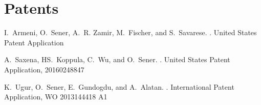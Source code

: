     \section{\mysidestyle \textcolor{olgray}{Patents}}
    	I.~Armeni, O.~Sener, A.~R. Zamir, M.~Fischer, and S.~Savarese.
	.
	\newblock United States Patent Application
	\vspace{-2mm}
	
	A.~Saxena, HS.~Koppula, C.~Wu, and O.~Sener.
	.
	\newblock United States Patent Application, 20160248847
	\vspace{-2mm}
	
		K.~Ugur, O.~Sener, E.~Gundogdu, and A.~Alatan.
	.
	\newblock International Patent Application, WO 2013144418 A1
	\vspace{-2mm}
